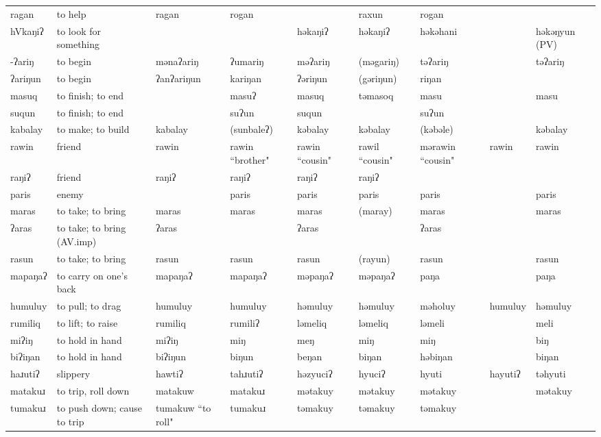 \begin{landscape}
\begin{longtable}{*{9}{p{}}}
\text{*}ragan & to help & ragan & rogan &  & raxun & rogan &  & \\
\text{*}hVkaŋiʔ & to look for something &  &  & həkaŋiʔ & həkaŋiʔ & həkəhani &  & həkəŋyun (PV)\\
\text{*}-ʔariŋ & to begin & mənaʔariŋ & ʔumariŋ & məʔariŋ & (məgariŋ) & təʔariŋ &  & təʔariŋ\\
\text{*}ʔariŋun & to begin & ʔanʔariŋun & kariŋan & ʔəriŋun & (gəriŋun) & riŋan &  & \\
\text{*}masuq & to finish; to end &  & masuʔ & masuq & təmasoq & masu &  & masu\\
\text{*}suqun & to finish; to end &  & suʔun & suqun &  & suʔun &  & \\
\text{*}kabalay & to make; to build & kabalay & (sunbaleʔ) & kəbalay & kəbalay & (kəbəle) &  & kəbalay\\
\text{*}rawin & friend & rawin & rawin ``brother" & rawin ``cousin" & rawil ``cousin" & mərawin ``cousin" & rawin & rawin\\
\text{*}raŋiʔ & friend & raŋiʔ & raŋiʔ & raŋiʔ & raŋiʔ &  &  & \\
\text{*}paris & enemy &  & paris & paris & paris & paris &  & paris\\
\text{*}maras & to take; to bring & maras & maras & maras & (maray) & maras &  & maras\\
\text{*}ʔaras & to take; to bring (AV.imp) & ʔaras &  & ʔaras &  & ʔaras &  & \\
\text{*}rasun & to take; to bring & rasun & rasun & rasun & (rayun) & rasun &  & rasun\\
\text{*}mapaŋaʔ & to carry on one's back & mapaŋaʔ & mapaŋaʔ & məpaŋaʔ & məpaŋaʔ & paŋa &  & paŋa\\
\text{*}humuluy & to pull; to drag & humuluy & humuluy & həmuluy & həmuluy & məholuy & humuluy & həmuluy\\
\text{*}rumiliq & to lift; to raise & rumiliq & rumiliʔ & ləmeliq & ləmeliq & ləmeli &  & meli\\
\text{*}miʔiŋ & to hold in hand & miʔiŋ & miŋ & meŋ & miŋ & miŋ &  & biŋ\\
\text{*}biʔiŋan & to hold in hand & biʔiŋun & biŋun & beŋan & biŋan & həbiŋan &  & biŋan\\
\text{*}haɹutiʔ & slippery & hawtiʔ & tahɹutiʔ & həzyuciʔ & hyuciʔ & hyuti & hayutiʔ & təhyuti\\
\text{*}matakuɹ & to trip, roll down & matakuw & matakuɹ & mətakuy & mətakuy & mətakuy &  & mətakuy\\
\text{*}tumakuɹ & to push down; cause to trip & tumakuw ``to roll" & tumakuɹ & təmakuy & təmakuy & təmakuy &  & \\

\end{longtable}
\end{landscape}
